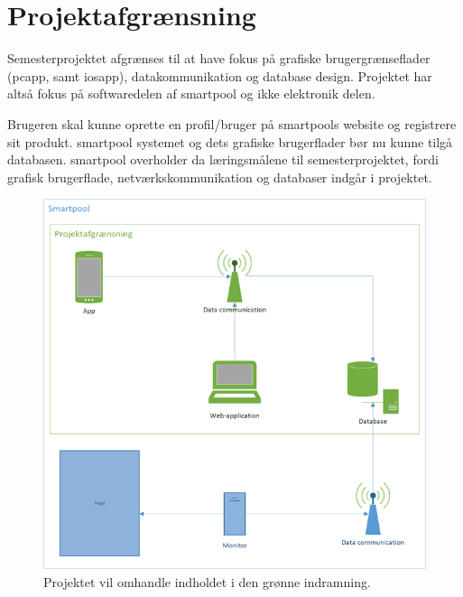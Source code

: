 \section{Projektafgrænsning}
Semesterprojektet afgrænses til at have fokus på grafiske brugergrænseflader (\gls{pcapp}, samt \gls{iosapp}), datakommunikation og database design. Projektet har altså fokus på softwaredelen af \gls{smartpool} og ikke elektronik delen.

Brugeren skal kunne oprette en profil/bruger på \glspl{smartpool} website og registrere sit produkt. \gls{smartpool} systemet og dets grafiske brugerflader bør nu kunne tilgå databasen. \gls{smartpool} overholder da læringsmålene til semesterprojektet, fordi grafisk brugerflade, netværkskommunikation og databaser indgår i projektet.

\begin{figure}
	\centering
	\includegraphics[width=0.9\linewidth]{figs/afgraensning.png}
	\caption{Projektet vil omhandle indholdet i den grønne indramning.}
	\label{fig:afgraensning}
\end{figure}
